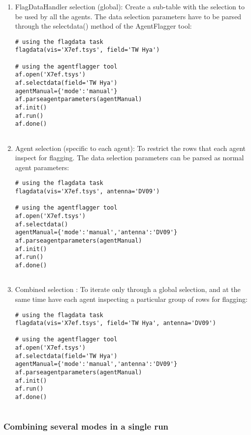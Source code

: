 \begin{enumerate}

\item FlagDataHandler selection (global): Create a sub-table with the selection
to be used by all the agents. The data selection parameters have to be parsed
through the selectdata() method of the AgentFlagger tool:

\begin{verbatim}
# using the flagdata task
flagdata(vis='X7ef.tsys', field='TW Hya')

# using the agentflagger tool
af.open('X7ef.tsys')
af.selectdata(field='TW Hya')
agentManual={'mode':'manual'}
af.parseagentparameters(agentManual)
af.init()
af.run()
af.done() 
		
\end{verbatim}

\item Agent selection (specific to each agent): To restrict the rows that each
agent inspect for flagging. The data selection parameters can be parsed as
normal agent parameters:

\begin{verbatim}
# using the flagdata task
flagdata(vis='X7ef.tsys', antenna='DV09')

# using the agentflagger tool
af.open('X7ef.tsys')
af.selectdata()
agentManual={'mode':'manual','antenna':'DV09'}
af.parseagentparameters(agentManual)
af.init()
af.run()
af.done() 
		
\end{verbatim}

\item Combined selection : To iterate only through a global selection, and at the
same time have each agent inspecting a particular group of rows for flagging:

\begin{verbatim}
# using the flagdata task
flagdata(vis='X7ef.tsys', field='TW Hya', antenna='DV09')

# using the agentflagger tool
af.open('X7ef.tsys')
af.selectdata(field='TW Hya')
agentManual={'mode':'manual','antenna':'DV09'}
af.parseagentparameters(agentManual)
af.init()
af.run()
af.done() 
		 
\end{verbatim}

\end{enumerate}

\subsubsection{Combining several modes in a single run}

